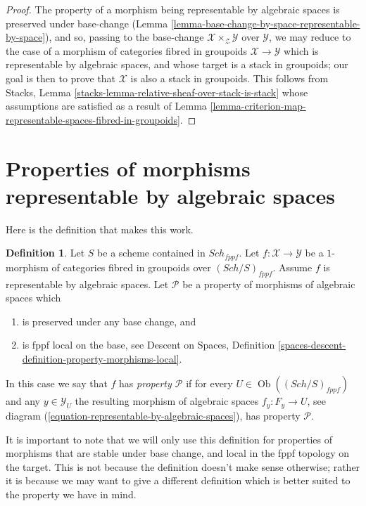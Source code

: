 \documentclass{stacks-project}
\theoremstyle{plain}
\theoremstyle{definition}
\newtheorem{definition}[subsection]{Definition}
\theoremstyle{remark}
\numberwithin{equation}{subsection}
\def\Sch{\mathit{Sch}}
\def\Ob{\mathop{\mathrm{Ob}}\nolimits}
\begin{document}
\begin{proof}
The property of a morphism being representable by algebraic spaces
is preserved under base-change
(Lemma \ref{lemma-base-change-by-space-representable-by-space}),
and so, passing to the base-change
$\mathcal{X} \times_\mathcal{Z} \mathcal{Y}$ over $\mathcal{Y}$,
we may reduce to the case of a morphism of categories
fibred in groupoids $\mathcal{X} \to \mathcal{Y}$
which is representable by algebraic spaces, and
whose target is a stack in groupoids; our goal is then to prove
that $\mathcal{X}$ is also a stack in groupoids.
This follows from Stacks, Lemma
\ref{stacks-lemma-relative-sheaf-over-stack-is-stack}
whose assumptions are satisfied as a result of
Lemma \ref{lemma-criterion-map-representable-spaces-fibred-in-groupoids}.
\end{proof}







\section{Properties of morphisms representable by algebraic spaces}
\label{section-representable-properties}

\noindent
Here is the definition that makes this work.

\begin{definition}
\label{definition-relative-representable-property}
Let $S$ be a scheme contained in $\Sch_{fppf}$.
Let $f : \mathcal{X} \to \mathcal{Y}$ be a $1$-morphism
of categories fibred in groupoids over $(\Sch/S)_{fppf}$.
Assume $f$ is representable by algebraic spaces.
Let $\mathcal{P}$ be a property of morphisms of algebraic spaces which
\begin{enumerate}
\item is preserved under any base change, and
\item is fppf local on the base, see
Descent on Spaces,
Definition \ref{spaces-descent-definition-property-morphisms-local}.
\end{enumerate}
In this case we say that $f$ has {\it property $\mathcal{P}$} if for every
$U \in \Ob((\Sch/S)_{fppf})$ and
any $y \in \mathcal{Y}_U$ the resulting morphism of algebraic spaces
$f_y : F_y \to U$, see
diagram (\ref{equation-representable-by-algebraic-spaces}),
has property $\mathcal{P}$.
\end{definition}

\noindent
It is important to note that we will only use this definition for
properties of morphisms that are stable under base change, and
local in the fppf topology on the target. This is
not because the definition doesn't make sense otherwise; rather it
is because we may want to give a different definition which is
better suited to the property we have in mind.
\end{document}
